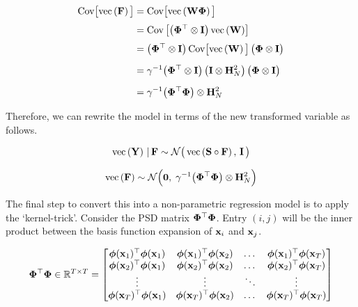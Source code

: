 \begin{align*}
    \text{Cov}\big[\text{\textup{vec}}\left(\mathbf{F}\right)\big] &= \text{Cov}\big[\text{\textup{vec}}\left(\mathbf{W} \mathbf{\Phi}\right)\big] \\[0.1cm]
    &= \text{Cov}\left[\big(\mathbf{\Phi}^\top \otimes \mathbf{I}\big) \, \text{\textup{vec}}\left(\mathbf{W}\right)\right] \\[0.1cm]
    &= \big(\mathbf{\Phi}^\top \otimes \mathbf{I}\big) \, \text{Cov}\big[\text{\textup{vec}}\left(\mathbf{W}\right)\big] \, \big(\mathbf{\Phi} \otimes \mathbf{I}\big) \\[0.2cm]
    &= \gamma^{-1}  \big(\mathbf{\Phi}^\top \otimes \mathbf{I}\big) \, \big(\mathbf{I} \otimes \mathbf{H}_N^{2} \big) \, \big(\mathbf{\Phi} \otimes \mathbf{I}\big) \\[0.2cm]
    &= \gamma^{-1} \big( \mathbf{\Phi}^\top \mathbf{\Phi} \big) \otimes \mathbf{H}_N^2
\end{align*}

Therefore, we can rewrite the model in terms of the new transformed variable as follows. 

\begin{equation}
    \text{\textup{vec}}\left(\mathbf{Y}\right) \, | \, \mathbf{F} \sim \mathcal{N}\big(\, \text{\textup{vec}}\left(\mathbf{S} \circ \mathbf{F}\right), \, \mathbf{I} \, \big)
\end{equation}

\begin{equation}
    \label{eq:F_prior2}
    \text{\textup{vec}}\left(\mathbf{F}\right) \sim \mathcal{N}\Big(\mathbf{0}, \; \gamma^{-1} \big(\mathbf{\Phi}^\top \mathbf{\Phi} \big) \otimes \mathbf{H}_N^{2}\Big)
\end{equation}


The final step to convert this into a non-parametric regression model is to apply the `kernel-trick'. Consider the PSD matrix $\mathbf{\Phi}^\top \mathbf{\Phi}$. Entry $(i, j)$ will be the inner product between the basis function expansion of $\mathbf{x}_i$ and $\mathbf{x}_j$. 

\begin{equation}
    \mathbf{\Phi}^\top \mathbf{\Phi} \in \mathbb{R}^{T \times T} = 
    \begin{bmatrix} 
        \boldsymbol{\phi}(\mathbf{x}_1)^\top\boldsymbol{\phi}(\mathbf{x}_1) & \boldsymbol{\phi}(\mathbf{x}_1)^\top\boldsymbol{\phi}(\mathbf{x}_2) & \dots & \boldsymbol{\phi}(\mathbf{x}_1)^\top\boldsymbol{\phi}(\mathbf{x}_T) \\
        \boldsymbol{\phi}(\mathbf{x}_2)^\top\boldsymbol{\phi}(\mathbf{x}_1) & \boldsymbol{\phi}(\mathbf{x}_2)^\top\boldsymbol{\phi}(\mathbf{x}_2) & \dots & \boldsymbol{\phi}(\mathbf{x}_2)^\top\boldsymbol{\phi}(\mathbf{x}_T) \\
        \vdots & \vdots & \ddots & \vdots  \\
        \boldsymbol{\phi}(\mathbf{x}_T)^\top\boldsymbol{\phi}(\mathbf{x}_1) & \boldsymbol{\phi}(\mathbf{x}_T)^\top\boldsymbol{\phi}(\mathbf{x}_2) & \dots & \boldsymbol{\phi}(\mathbf{x}_T)^\top\boldsymbol{\phi}(\mathbf{x}_T) \\
    \end{bmatrix}
\end{equation}

